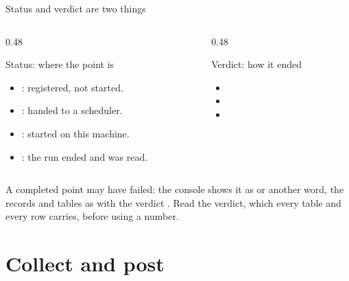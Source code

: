 \begin{frame}{Status and verdict are two things}
\begin{columns}[T]
\begin{column}{0.48\textwidth}
\begin{block}{Status: where the point is}
\begin{itemize}\small
  \item {}: registered, not started.
  \item {}: handed to a scheduler.
  \item {}: started on this machine.
  \item {}: the run ended and was read.
\end{itemize}
\end{block}
\end{column}
\begin{column}{0.48\textwidth}
\begin{block}{Verdict: how it ended}
\begin{itemize}\small
  \item {}
  \item {}
  \item {}
\end{itemize}
\end{block}
\end{column}
\end{columns}
\begin{cfdbpitfall}
A completed point may have failed: the console shows it as
 or another  word, the records and tables
as  with the verdict . Read the verdict, which
every table and every  row carries, before using a number.
\end{cfdbpitfall}
\end{frame}

\section{Collect and post}

